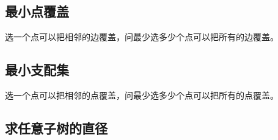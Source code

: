 \subsection{最小点覆盖}
选一个点可以把相邻的边覆盖，问最少选多少个点可以把所有的边覆盖。


\subsection{最小支配集}
选一个点可以把相邻的点覆盖，问最少选多少个点可以把所有的点覆盖。


\subsection{求任意子树的直径}


